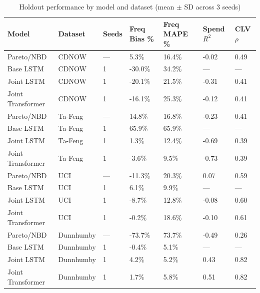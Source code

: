 \begin{table}
\caption{Holdout performance by model and dataset (mean $\pm$ SD across 3 seeds)}
\label{tab:model_comparison_aggregated}
\begin{tabular}{lllllll}
\toprule
Model & Dataset & Seeds & Freq Bias \% & Freq MAPE \% & Spend $R^2$ & CLV $\rho$ \\
\midrule
Pareto/NBD & CDNOW & — & 5.3\% & 16.4\% & -0.02 & 0.49 \\
Base LSTM & CDNOW & 1 & -30.0\% & 34.2\% & — & — \\
Joint LSTM & CDNOW & 1 & -20.1\% & 21.5\% & -0.31 & 0.41 \\
Joint Transformer & CDNOW & 1 & -16.1\% & 25.3\% & -0.12 & 0.41 \\
Pareto/NBD & Ta-Feng & — & 14.8\% & 16.8\% & -0.23 & 0.41 \\
Base LSTM & Ta-Feng & 1 & 65.9\% & 65.9\% & — & — \\
Joint LSTM & Ta-Feng & 1 & 1.3\% & 12.4\% & -0.69 & 0.39 \\
Joint Transformer & Ta-Feng & 1 & -3.6\% & 9.5\% & -0.73 & 0.39 \\
Pareto/NBD & UCI & — & -11.3\% & 20.3\% & 0.07 & 0.59 \\
Base LSTM & UCI & 1 & 6.1\% & 9.9\% & — & — \\
Joint LSTM & UCI & 1 & -8.7\% & 12.8\% & -0.08 & 0.60 \\
Joint Transformer & UCI & 1 & -0.2\% & 18.6\% & -0.10 & 0.61 \\
Pareto/NBD & Dunnhumby & — & -73.7\% & 73.7\% & -0.49 & 0.26 \\
Base LSTM & Dunnhumby & 1 & -0.4\% & 5.1\% & — & — \\
Joint LSTM & Dunnhumby & 1 & 4.2\% & 5.2\% & 0.43 & 0.82 \\
Joint Transformer & Dunnhumby & 1 & 1.7\% & 5.8\% & 0.51 & 0.82 \\
\bottomrule
\end{tabular}
\end{table}
